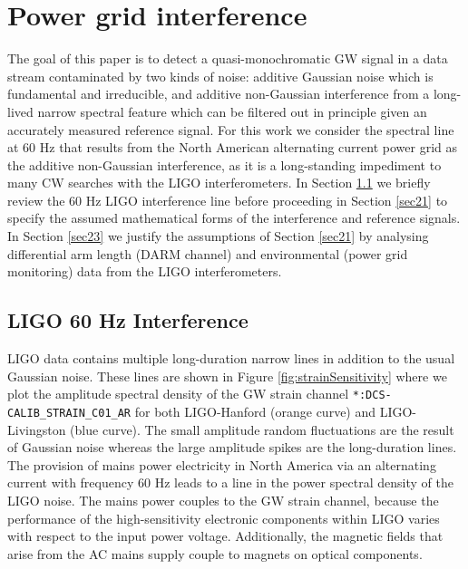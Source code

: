 \documentclass[pra,superscriptaddress,reprint,amsmath,amssymb,nofootinbib]{revtex4-2}
\begin{document}
\section{Power grid interference} \label{sec:pgi}
The goal of this paper is to detect a quasi-monochromatic GW signal in a data stream contaminated by two kinds of noise: additive Gaussian noise which is fundamental and irreducible, and additive non-Gaussian interference from a long-lived narrow spectral feature which can be filtered out in principle given an accurately measured reference signal. For this work we consider the spectral line at 60 Hz that results from the North American alternating current power grid as the additive non-Gaussian interference, as it is a long-standing impediment to many CW searches with the LIGO interferometers. In Section \ref{sec22} we briefly review the 60 Hz LIGO interference line before proceeding in Section \ref{sec21} to specify the assumed mathematical forms of the interference and reference signals. In Section \ref{sec23} we justify the assumptions of Section \ref{sec21} by analysing differential arm length (DARM channel) and environmental (power grid monitoring) data from the LIGO interferometers. 


\subsection{LIGO 60 Hz Interference}  \label{sec22}

LIGO data contains multiple long-duration narrow lines in addition to the usual Gaussian noise. These lines are shown in Figure \ref{fig:strainSensitivity} where we plot the amplitude spectral density of the GW strain channel \texttt{*:DCS-CALIB\_STRAIN\_C01\_AR} for both LIGO-Hanford (orange curve) and LIGO-Livingston (blue curve). The small amplitude random fluctuations are the result of Gaussian noise whereas the large amplitude spikes are the long-duration lines. The provision of mains power electricity in North America via an alternating current with frequency 60 Hz leads to a line in the power spectral density of the LIGO noise. The mains power couples to the GW strain channel, because the performance of the high-sensitivity electronic components within LIGO varies with respect to the input power voltage. Additionally, the magnetic fields that arise from the AC mains supply couple to magnets on optical components. \newline 
\end{document}

